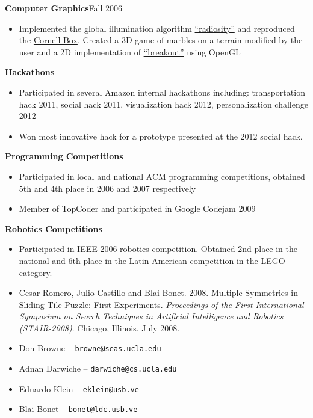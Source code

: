 \documentclass[10pt]{article}
\newcommand{\vitem}{\vspace*{-.4pc}\item}
\begin{document}

\textbf{Computer Graphics}\hfill Fall 2006
\begin{itemize}
 \vitem Implemented the global illumination algorithm
  \href{http://en.wikipedia.org/wiki/Radiosity_\%283D_computer_graphics\%29}{``radiosity''}
  and reproduced the 
  \href{http://en.wikipedia.org/wiki/Cornell_box}{Cornell Box}.
  Created a 3D game of marbles on a terrain modified by the user and a
  2D implementation of
  \href{http://en.wikipedia.org/wiki/Breakout_\%28arcade_game\%29}{``breakout''}
  using OpenGL
\end{itemize}

\flushleft{}\textbf{Hackathons}
\begin{itemize}
\vitem Participated in several Amazon internal hackathons including:
transportation hack 2011, social hack 2011, visualization hack 2012,
personalization challenge 2012
\vitem Won most innovative hack for a prototype presented at the 2012
social hack.
\end{itemize}

\flushleft{}\textbf{Programming Competitions}
\begin{itemize}
\vitem Participated in local and national ACM programming competitions, obtained 5th and 4th place in 2006 and 2007 respectively
\vitem Member of TopCoder and participated in Google Codejam 2009
\end{itemize}

\textbf{Robotics Competitions}
\begin{itemize}
\vitem Participated in IEEE 2006 robotics competition. Obtained 2nd place in the national and 6th place in the Latin American competition in the LEGO category.
\end{itemize}

\begin{itemize}
\vitem Cesar Romero, Julio Castillo and
\href{http://www.ldc.usb.ve/~bonet}{Blai Bonet}. 2008. Multiple
Symmetries in Sliding-Tile Puzzle: First Experiments. \emph{Proceedings of the First International Symposium on Search Techniques in Artificial Intelligence and Robotics (STAIR-2008)}. Chicago, Illinois. July 2008. 
\end{itemize}

\begin{itemize}
\vitem Don Browne -- \texttt{browne@seas.ucla.edu}
\vitem Adnan Darwiche -- \texttt{darwiche@cs.ucla.edu}
\vitem Eduardo Klein -- \texttt{eklein@usb.ve}
\vitem Blai Bonet -- \texttt{bonet@ldc.usb.ve}
\end{itemize}
\end{document}
